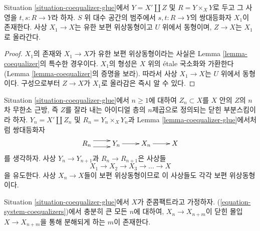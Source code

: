 \begin{lemma}
\label{lemma-coequalizer-glue}
Situation \ref{situation-coequalizer-glue}에서
$Y = X' \amalg Z$ 및 $R = Y \times_X Y$로 두고 그 사영을
$t, s : R \to Y$라 하자. $S$ 위 대수 공간의 범주에서
$s, t : R \to Y$의 쌍대등화자 $X_1$이 존재한다. 사상
$X_1 \to X$는 유한 보편 위상동형이고 $U$ 위에서 동형이며,
$Z \to X$는 $X_1$로 올라간다.
\end{lemma}

\begin{proof}
$X_1$의 존재와 $X_1 \to X$가 유한 보편 위상동형이라는 사실은
Lemma \ref{lemma-coequalizer}의 특수한 경우이다. $X_1$의 형성은
$X$ 위의 \'etale 국소화와 가환한다(Lemma
\ref{lemma-coequalizer}의 증명을 보라). 따라서 사상 $X_1 \to X$는
$U$ 위에서 동형이다. 구성으로부터 $Z \to X$가 $X_1$로 올라감은
즉시 알 수 있다.
\end{proof}

\noindent
Situation \ref{situation-coequalizer-glue}에서 $n \geq 1$에 대하여
$Z_n \subset X$를 $X$ 안의 $Z$의 $n$차 무한소 근방, 즉 $Z$를 잘라
내는 아이디얼 층의 $n$제곱으로 정의되는
닫힌 부분스킴이라 하자. $Y_n = X' \amalg Z_n$ 및
$R_n = Y_n \times_X Y_n$과 Lemma \ref{lemma-coequalizer-glue}에서처럼
쌍대등화자
$$
\xymatrix{
R_n \ar@<1ex>[r] \ar@<-1ex>[r] & Y_n \ar[r] & X_n \ar[r] & X
}
$$
를 생각하자. 사상 $Y_n \to Y_{n + 1}$과 $R_n \to R_{n + 1}$은 사상들
\begin{equation}
\label{equation-system-coequalizers}
X_1 \to X_2 \to X_3 \to \ldots \to X
\end{equation}
을 유도한다. 사상 $X_n \to X$들이 보편 위상동형이므로 이 사상들도
각각 보편 위상동형이다.

\begin{lemma}
\label{lemma-essentially-constant}
Situation \ref{situation-coequalizer-glue}에서 $X$가 준콤팩트라고 가정하자.
(\ref{equation-system-coequalizers})에서 충분히 큰 모든 $n$에 대하여,
$X_n \to X_{n + m}$이 닫힌 몰입 $X \to X_{n + m}$을 통해 분해되게 하는
$m$이 존재한다.
\end{lemma}

